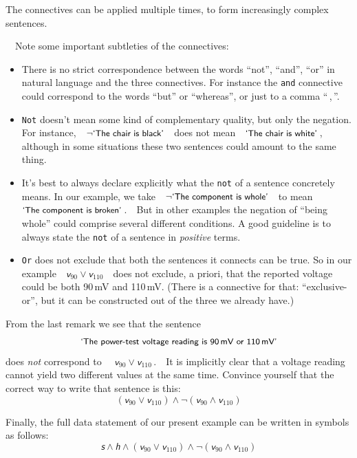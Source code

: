 \documentclass[
  a4paper,
  DIV=11,
  numbers=noendperiod,
  oneside]{scrreprt}
\begin{document}
\hfill\break

The connectives can be applied multiple times, to form increasingly
complex sentences.

~~Note some important subtleties of the
connectives:

\begin{itemize}
\item
  There is no strict correspondence between the words ``not'', ``and'',
  ``or'' in natural language and the three connectives. For instance the
  \texttt{and} connective could correspond to the words ``but'' or
  ``whereas'', or just to a comma ``\,,\,''.
\item
  \texttt{Not} doesn't mean some kind of complementary quality, but only
  the negation. For
  instance,~~\(\lnot\textsf{\small`The chair is black'}\)~~does not
  mean~~{\(\textsf{\small`The chair is white'}\)\,,}~~ although in some
  situations these two sentences could amount to the same thing.
\item
  It's best to always declare explicitly what the \texttt{not} of a
  sentence concretely means. In our example, we
  take~~\(\lnot\textsf{\small`The component is whole'}\)~~to
  mean~~{\(\textsf{\small`The component is broken'}\)\,.}~~But in other
  examples the negation of ``being whole'' could comprise several
  different conditions. A good guideline is to always state the
  \texttt{not} of a sentence in \emph{positive} terms.
\item
  \texttt{Or} does not exclude that both the sentences it connects can
  be true. So in our
  example~~\(\mathsfit{v}_{90} \lor \mathsfit{v}_{110}\)~~does not
  exclude, a priori, that the reported voltage could be both 90\,mV and
  110\,mV. (There is a connective for that: ``exclusive-or'', but it can
  be constructed out of the three we already have.)
\end{itemize}

From the last remark we see that the sentence \[
\textsf{\small`The power-test voltage reading is 90\,mV or 110\,mV'}
\] does \emph{not} correspond to
~~{\(\mathsfit{v}_{90} \lor \mathsfit{v}_{110}\)\,.}~~It is implicitly
clear that a voltage reading cannot yield two different values at the
same time. Convince yourself that the correct way to write that sentence
is this: \[
(\mathsfit{v}_{90} \lor \mathsfit{v}_{110})
\land
\lnot(\mathsfit{v}_{90} \land \mathsfit{v}_{110})
\]

Finally, the full data statement of our present example can be written
in symbols as follows: \[
\mathsfit{s} \land \mathsfit{h} \land
(\mathsfit{v}_{90} \lor \mathsfit{v}_{110})
\land
\lnot(\mathsfit{v}_{90} \land \mathsfit{v}_{110})
\]
\end{document}
